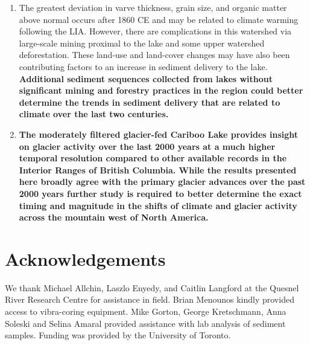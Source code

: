 \documentclass[Royal,times,doublespace,sageh]{sagej}
\begin{document}
\begin{enumerate}
{  (\textasciitilde1600 to 1900 CE) are best correlated with grain size
  in Cariboo Lake. The trends in varve thickness were not as strong but
  still help confirm trends observed in grain size. Organic matter
  content is the least correlated with the other sediment metrics and
  may be more sensitive to vegetation changes in the basin. We conclude
  that sediment accumulation in Cariboo Lake was more sensitive to
  glacier activity during the LIA compared to earlier advances.}
\item
  The greatest deviation in varve thickness, grain size, and organic
  matter above normal occurs after 1860 CE and may be related to climate
  warming following the LIA. However, there are complications in this
  watershed via large-scale mining proximal to the lake and some upper
  watershed deforestation. These land-use and land-cover changes may
  have also been contributing factors to an increase in sediment
  delivery to the lake. \textbf{Additional sediment sequences collected
  from lakes without significant mining and forestry practices in the
  region could better determine the trends in sediment delivery that are
  related to climate over the last two centuries.}
\item
  \textbf{The moderately filtered glacier-fed Cariboo Lake provides
  insight on glacier activity over the last 2000 years at a much higher
  temporal resolution compared to other available records in the
  Interior Ranges of British Columbia. While the results presented here
  broadly agree with the primary glacier advances over the past 2000
  years further study is required to better determine the exact timing
  and magnitude in the shifts of climate and glacier activity across the
  mountain west of North America.}
\end{enumerate}

\pagebreak

\hypertarget{acknowledgements}{%
\section{Acknowledgements}\label{acknowledgements}}

We thank Michael Allchin, Laszlo Enyedy, and Caitlin Langford at the
Quesnel River Research Centre for assistance in field. Brian Menounos
kindly provided access to vibra-coring equipment. Mike Gorton, George
Kretschmann, Anna Soleski and Selina Amaral provided assistance with lab
analysis of sediment samples. Funding was provided by the University of
Toronto.

\pagebreak



\end{document}
